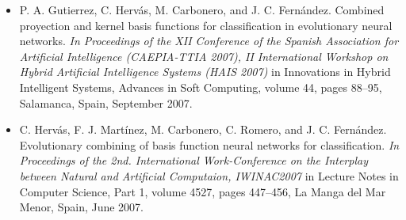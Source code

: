 \begin{itemize}
{			Conference	Predictive Modelling in Foods, IC PMF 2007}, pages 291–294, Athens,
			Greece, September	2007.
	\item P. A. Gutierrez, C. Hervás, M. Carbonero, and J. C. Fernández. Combined proyection and
			kernel basis functions for classification in evolutionary neural networks. \textit{In
			Proceedings	of the XII Conference of the Spanish Association for Artificial
			Intelligence (CAEPIA-TTIA 2007), II International Workshop on Hybrid Artificial
			Intelligence Systems	(HAIS 2007)} in Innovations in Hybrid Intelligent Systems,
			Advances in Soft Computing, volume 44, pages 88–95, Salamanca, Spain, September 2007.
	\item C. Hervás, F. J. Martínez, M. Carbonero, C. Romero, and J. C. Fernández. Evolutionary
			combining of basis function neural networks for classification. \textit{In Proceedings of
			the 2nd.	International Work-Conference on the Interplay between Natural and
			Artificial Computaion, IWINAC2007} in Lecture Notes in Computer Science, Part 1,
			volume 4527, pages	447–456, La Manga del Mar Menor, Spain, June 2007.
\end{itemize}

